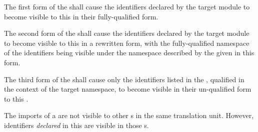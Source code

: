 \specsubitem
The first form of the  shall cause the identifiers
declared by the target module to become visible to this 
in their fully-qualified form.

\specsubitem
The second form of the  shall cause the identifiers
declared by the target module to become visible to this 
in a rewritten form, with the fully-qualified namespace of the identifiers
being visible under the namespace described by the  given in
this form.


\specsubitem
The third form of the  shall cause only the
identifiers listed in the , qualified in the context
of the target namespace, to become visible in their un-qualified form to this
.


\specsubitem
The imports of a  are not visible to other
s in the same translation unit. However, identifiers
\textit{declared} in this  are visible in those
s.
